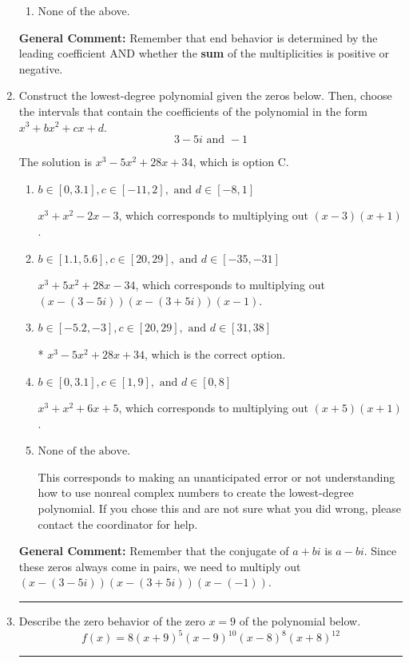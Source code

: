 \documentclass{extbook}[14pt]
\newcommand{\litem}[1]{\item #1

\rule{\textwidth}{0.4pt}}
\begin{document}
\begin{enumerate}
{\begin{enumerate}[label=\Alph*.]
\begin{multicols}{2}
\end{multicols}\item None of the above.\end{enumerate}
\textbf{General Comment:} Remember that end behavior is determined by the leading coefficient AND whether the \textbf{sum} of the multiplicities is positive or negative.
}
\litem{
Construct the lowest-degree polynomial given the zeros below. Then, choose the intervals that contain the coefficients of the polynomial in the form $x^3+bx^2+cx+d$.
\[ 3 - 5 i \text{ and } -1 \]

The solution is \( x^{3} -5 x^{2} +28 x + 34 \), which is option C.\begin{enumerate}[label=\Alph*.]
\item \( b \in [0, 3.1], c \in [-11, 2], \text{ and } d \in [-8, 1] \)

$x^{3} + x^{2} -2 x -3$, which corresponds to multiplying out $(x -3)(x + 1)$.
\item \( b \in [1.1, 5.6], c \in [20, 29], \text{ and } d \in [-35, -31] \)

$x^{3} +5 x^{2} +28 x -34$, which corresponds to multiplying out $(x-(3 - 5 i))(x-(3 + 5 i))(x -1)$.
\item \( b \in [-5.2, -3], c \in [20, 29], \text{ and } d \in [31, 38] \)

* $x^{3} -5 x^{2} +28 x + 34$, which is the correct option.
\item \( b \in [0, 3.1], c \in [1, 9], \text{ and } d \in [0, 8] \)

$x^{3} + x^{2} +6 x + 5$, which corresponds to multiplying out $(x + 5)(x + 1)$.
\item \( \text{None of the above.} \)

This corresponds to making an unanticipated error or not understanding how to use nonreal complex numbers to create the lowest-degree polynomial. If you chose this and are not sure what you did wrong, please contact the coordinator for help.
\end{enumerate}

\textbf{General Comment:} Remember that the conjugate of $a+bi$ is $a-bi$. Since these zeros always come in pairs, we need to multiply out $(x-(3 - 5 i))(x-(3 + 5 i))(x-(-1))$.
}
\litem{
Describe the zero behavior of the zero $x = 9$ of the polynomial below.
\[ f(x) = 8(x + 9)^{5}(x - 9)^{10}(x - 8)^{8}(x + 8)^{12} \]

}
\end{enumerate}
\end{document}
